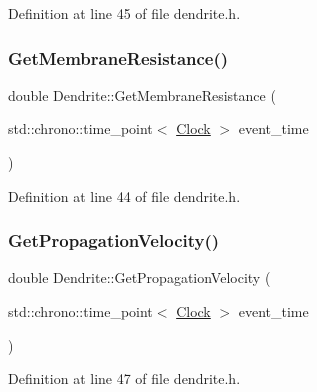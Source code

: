 Definition at line 45 of file dendrite.\+h.

\mbox{\label{class_dendrite_ab70008318cada82e0f21f8f010858eaa}} 
\subsubsection{\texorpdfstring{Get\+Membrane\+Resistance()}{GetMembraneResistance()}}
{\footnotesize\ttfamily double Dendrite\+::\+Get\+Membrane\+Resistance (\begin{DoxyParamCaption}\item[{std\+::chrono\+::time\+\_\+point$<$ \hyperlink{universe_8h_a0ef8d951d1ca5ab3cfaf7ab4c7a6fd80}{Clock} $>$}]{event\+\_\+time }\end{DoxyParamCaption})\hspace{0.3cm}{\ttfamily [inline]}}



Definition at line 44 of file dendrite.\+h.

\mbox{\label{class_dendrite_af0315957a349532d25691385b6486e95}} 
\subsubsection{\texorpdfstring{Get\+Propagation\+Velocity()}{GetPropagationVelocity()}}
{\footnotesize\ttfamily double Dendrite\+::\+Get\+Propagation\+Velocity (\begin{DoxyParamCaption}\item[{std\+::chrono\+::time\+\_\+point$<$ \hyperlink{universe_8h_a0ef8d951d1ca5ab3cfaf7ab4c7a6fd80}{Clock} $>$}]{event\+\_\+time }\end{DoxyParamCaption})\hspace{0.3cm}{\ttfamily [inline]}}



Definition at line 47 of file dendrite.\+h.

\mbox{\label{class_dendrite_a6a0c08a642c92d8e189e1f7eff6f6b00}} 
